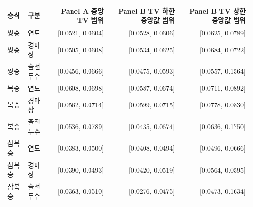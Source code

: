 \begin{tabular}{llrrr}
\toprule
승식 & 구분 & Panel A 중앙 TV 범위 & Panel B TV 하한 중앙값 범위 & Panel B TV 상한 중앙값 범위 \\
\midrule
쌍승 & 연도 & [0.0521, 0.0604] & [0.0528, 0.0606] & [0.0625, 0.0789] \\
쌍승 & 경마장 & [0.0505, 0.0608] & [0.0534, 0.0625] & [0.0684, 0.0722] \\
쌍승 & 출전두수 & [0.0456, 0.0666] & [0.0475, 0.0593] & [0.0557, 0.1564] \\
복승 & 연도 & [0.0608, 0.0698] & [0.0587, 0.0674] & [0.0711, 0.0892] \\
복승 & 경마장 & [0.0562, 0.0714] & [0.0599, 0.0715] & [0.0778, 0.0830] \\
복승 & 출전두수 & [0.0536, 0.0789] & [0.0435, 0.0674] & [0.0636, 0.1750] \\
삼복승 & 연도 & [0.0383, 0.0500] & [0.0408, 0.0494] & [0.0496, 0.0666] \\
삼복승 & 경마장 & [0.0390, 0.0493] & [0.0420, 0.0519] & [0.0564, 0.0595] \\
삼복승 & 출전두수 & [0.0363, 0.0510] & [0.0276, 0.0475] & [0.0473, 0.1634] \\
\bottomrule
\end{tabular}

